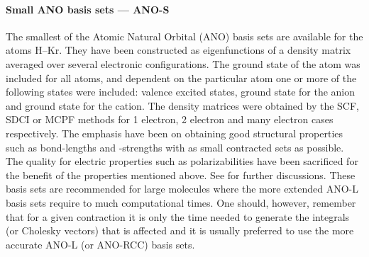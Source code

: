 \paragraph{Small ANO basis sets --- ANO-S}

The smallest of the Atomic Natural Orbital (ANO) basis sets are available for
the atoms H--Kr. They have been constructed as eigenfunctions of a density
matrix averaged over several electronic configurations. The ground state
of the atom was included for all atoms, and dependent on the particular atom
one or more of the following states were included:
valence excited states, ground state for the anion and ground state for
the cation. The density matrices were obtained by the SCF, SDCI or MCPF
methods for 1 electron, 2 electron and many electron cases respectively.
The emphasis have been on obtaining good structural properties such as
bond-lengths and -strengths with as small contracted sets as possible.
The quality for electric properties such as polarizabilities have been
sacrificed for the benefit of the properties mentioned above.
See \cite{anoIV} for further discussions. These basis sets are recommended for
large molecules where the more extended ANO-L basis sets require to much
computational times. One should, however, remember that for a given contraction
it is only the time needed to generate the integrals (or Cholesky vectors) that
is affected and it is usually preferred to use the more accurate ANO-L (or
ANO-RCC) basis sets.

